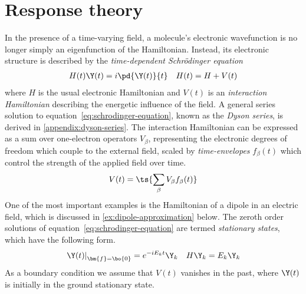\chapter{Response theory}

\begin{rmk}
In the presence of a time-varying field, a molecule's electronic wavefunction is no longer simply an eigenfunction of the Hamiltonian.
Instead, its electronic structure is described by the \textit{time-dependent Schr\"odinger equation}
\begin{align}
\label{eq:schrodinger-equation}
  H(t)
  \Y(t)
=
  i
  \pd{\Y(t)}{t}
&&
  H(t)
=
  H
+
  V(t)
\end{align}
where $H$ is the usual electronic Hamiltonian and $V(t)$ is an \textit{interaction Hamiltonian} describing the energetic influence of the field.
A general series solution to equation~\ref{eq:schrodinger-equation}, known as the \textit{Dyson series}, is derived in \cref{appendix:dyson-series}.
The interaction Hamiltonian can be expressed as a sum over one-electron operators $V_\beta$, representing the electronic degrees of freedom which couple to the external field, scaled by \emph{time-envelopes} $f_\beta(t)$ which control the strength of the applied field over time.
\begin{align}
\label{eq:interaction-time-envelopes}
  V(t)
=
\ts{
  \sum_\beta
  V_\beta
  f_\beta(t)
}
\end{align}
One of the most important examples is the Hamiltonian of a dipole in an electric field, which is discussed in \cref{ex:dipole-approximation} below.
The zeroth order solutions of equation~\ref{eq:schrodinger-equation} are termed \textit{stationary states}, which have the following form.\footnotemark
{}
\begin{align}
  \left.
  \Y(t)
  \right|_{\bm{f}=\bo{0}}
=
  e^{-iE_kt}
  \Y_k
&&
  H\Y_k
=
  E_k\Y_k
\end{align}
As a boundary condition we assume that $V(t)$ vanishes in the past, where $\Y(t)$ is initially in the ground stationary state.
\begin{align}

\end{align}
\end{rmk}
